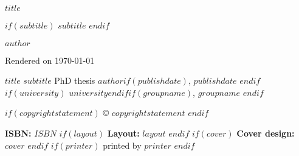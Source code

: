 \documentclass[$for(classoption)$$classoption$$sep$,$endfor$,twoside,openright]{book}
\begin{document}

\dominitoc
\doparttoc


\pagestyle{plain}
\begin{titlepage}
    \begin{center}
        \huge
        \null
        \vspace{3cm}
        \textbf{$title$}

        $if(subtitle)$
        \LARGE
        $subtitle$
        $endif$

        \vfill
        \Large
        $author$

        \vspace{2.5cm}
        \normalsize
        Rendered on \today
    \end{center}
    \newpage

    \null
    \vfill
    \setlength{\parindent}{0.0in}
    \begin{spacing}{1}

        \normalsize

        $title$
        \newline
        $subtitle$
        \newline
        PhD thesis
        \newline
        $author$$if(publishdate)$, $publishdate$ $endif$
        $if(university)$
        \newline
        $university$$endif$$if(groupname)$, $groupname$ $endif$

        \vspace{.5cm}

        $if(copyrightstatement)$
        \copyright
        $copyrightstatement$
        $endif$

        \vspace{.5cm}

        \textbf{ISBN:} $ISBN$
        $if(layout)$
        \newline
        \textbf{Layout:} $layout$
        $endif$
        $if(cover)$
        \newline
        \textbf{Cover design:} $cover$
        $endif$
        $if(printer)$
        \newline
        printed by $printer$
        $endif$

        \vspace{.5cm}


\end{spacing}
\end{titlepage}
\end{document}
